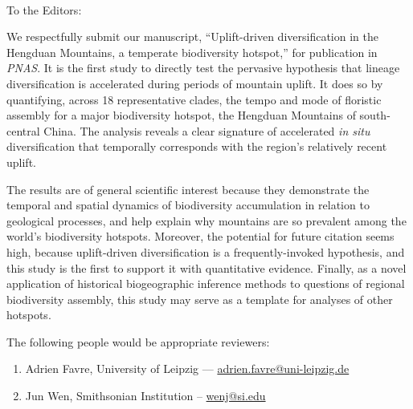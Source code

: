 \documentclass[12pt]{letter}
\begin{document}
\raggedright{}

\begin{letter}{ \\

}
\address{Integrative Research Center\\
  The Field Museum\\
  1400 South Lake Shore Drive\\
  Chicago, IL  60605-2496\\
  USA}

\opening{To the Editors:}

We respectfully submit our manuscript, ``Uplift-driven diversification
in the Hengduan Mountains, a temperate biodiversity hotspot,'' for
publication in \textit{PNAS}. It is the first study to directly test
the pervasive hypothesis that lineage diversification is accelerated
during periods of mountain uplift. It does so by quantifying, across
18 representative clades, the tempo and mode of floristic assembly for
a major biodiversity hotspot, the Hengduan Mountains of south-central
China. The analysis reveals a clear signature of accelerated
\textit{in situ} diversification that temporally corresponds with the
region's relatively recent uplift.

The results are of general scientific interest because they
demonstrate the temporal and spatial dynamics of biodiversity
accumulation in relation to geological processes, and help explain why
mountains are so prevalent among the world's biodiversity
hotspots. Moreover, the potential for future citation seems high,
because uplift-driven diversification is a frequently-invoked
hypothesis, and this study is the first to support it with
quantitative evidence. Finally, as a novel application of historical
biogeographic inference methods to questions of regional biodiversity
assembly, this study may serve as a template for analyses of other
hotspots.

The following people would be appropriate reviewers:

\begin{enumerate}

\item Adrien Favre, University of Leipzig ---
  \href{mailto:adrien.favre@uni-leipzig.de}{adrien.favre@uni-leipzig.de}

\item Jun Wen, Smithsonian Institution -- \href{mailto:wenj@si.edu}{wenj@si.edu}


\end{enumerate}
\end{letter}
\end{document}

